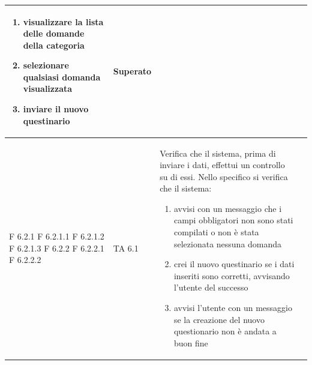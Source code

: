 \documentclass[a4paper,11pt]{article}
\begin{document}
\begin{longtable}{p{}p{}p{}p{}}
\begin{enumerate}
\item visualizzare la lista delle domande della categoria
\item selezionare qualsiasi domanda visualizzata
\item inviare il nuovo questinario
\end{enumerate} & Superato\\
\midrule
F 6.2.1 \newline F 6.2.1.1 \newline F 6.2.1.2 \newline F 6.2.1.3 \newline F 6.2.2 \newline F 6.2.2.1 \newline F 6.2.2.2 &  TA 6.1 &Verifica che il sistema, prima di inviare i dati, effettui un controllo su di essi. Nello specifico si verifica che il sistema: 
\begin{enumerate}
\item avvisi con un messaggio che i campi obbligatori non sono stati compilati o non è stata selezionata nessuna domanda
\item crei il nuovo questinario se i dati inseriti sono corretti, avvisando l'utente del successo
\item avvisi l'utente con un messaggio se la creazione del nuovo questionario non è andata a buon fine


\end{enumerate}
\end{longtable}
\end{document}
